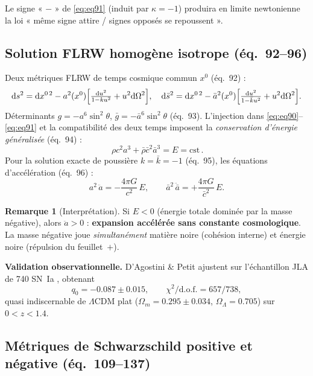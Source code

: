 \documentclass[11pt,a4paper]{article}
\theoremstyle{definition}
\newtheorem{remarque}{Remarque}[section]
\theoremstyle{plain}
\newcommand{\gbar}{\bar{g}}
\newcommand{\rhobar}{\bar{\rho}}
\newcommand{\abar}{\bar{a}}
\newcommand{\cbar}{\bar{c}}
\newcommand{\eqpaper}[1]{\textsf{(éq.~#1)}}   %
\begin{document}
Le signe « $-$ » de \eqref{eq:eq91} (induit par $\kappa=-1$) produira en limite newtonienne la
loi « même signe attire / signes opposés se repoussent ».

\subsection{Solution FLRW homogène isotrope \eqpaper{92--96}}

Deux métriques FLRW de temps cosmique commun $x^0$ \eqpaper{92} :
\begin{equation}
\dd s^2=\dd x^{0\,2}-a^2(x^0)\Bigl[\tfrac{\dd u^2}{1-ku^2}+u^2\dd\Omega^2\Bigr],\quad
\dd\bar s^2=\dd x^{0\,2}-\abar^2(x^0)\Bigl[\tfrac{\dd u^2}{1-\bar k u^2}+u^2\dd\Omega^2\Bigr].
\end{equation}
Déterminants $g=-a^6\sin^2\theta$, $\gbar=-\abar^6\sin^2\theta$ \eqpaper{93}. L'injection dans
\eqref{eq:eq90}--\eqref{eq:eq91} et la compatibilité des deux temps imposent la
\emph{conservation d'énergie généralisée} \eqpaper{94} :
\begin{equation}
\boxed{\,\rho c^2 a^3+\rhobar\cbar^2\abar^3=E=\text{cst}\,}.
\label{eq:conserv}
\end{equation}
Pour la solution exacte de poussière $k=\bar k=-1$ \eqpaper{95}, les équations d'accélération
\eqpaper{96} :
\begin{equation}
a^2\,\ddot a=-\frac{4\pi G}{c^2}\,E,\qquad
\abar^2\,\ddot{\abar}=+\frac{4\pi G}{\cbar^2}\,E.
\label{eq:accel}
\end{equation}

\begin{remarque}[Interprétation]
Si $E<0$ (énergie totale dominée par la masse négative), alors $\ddot a>0$ : \textbf{expansion
accélérée sans constante cosmologique}. La masse négative joue \emph{simultanément} matière
noire (cohésion interne) et énergie noire (répulsion du feuillet~$+$).
\end{remarque}

\textbf{Validation observationnelle.} D'Agostini \& Petit \cite{DAgostini2018} ajustent sur
l'échantillon JLA de 740 SN~Ia \cite{Betoule2014}, obtenant
\begin{equation}
q_0=-0.087\pm0.015,\qquad \chi^2/\mathrm{d.o.f.}=657/738,
\end{equation}
quasi indiscernable de $\Lambda$CDM plat ($\Omega_m=0.295\pm0.034$, $\Omega_\Lambda=0.705$)
sur $0<z<1.4$.

\subsection{Métriques de Schwarzschild positive et négative \eqpaper{109--137}}
\end{document}
